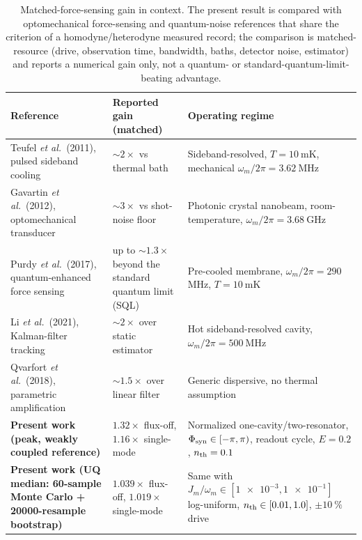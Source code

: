 \documentclass[preprint,numbers,a4paper]{elsarticle}
\begin{document}
\begin{table}[ht]
  \centering
  \caption{Matched-force-sensing gain in context. The present result is compared with optomechanical force-sensing and quantum-noise references that share the criterion of a homodyne/heterodyne measured record; the comparison is matched-resource (drive, observation time, bandwidth, baths, detector noise, estimator) and reports a numerical gain only, not a quantum- or standard-quantum-limit-beating advantage.}
  \label{tab:context-comparison}
  \begin{tabular}{@{}p{}p{}p{}@{}}
    \toprule
    Reference & Reported gain (matched) & Operating regime \\
    \midrule
    Teufel \emph{et al.}~(2011), pulsed sideband cooling & $\sim\num{2}\times$ vs thermal bath & Sideband-resolved, $T=\num{10}~$\si{\milli\kelvin}, mechanical $\omega_m/2\pi=\num{3.62}~$\si{\mega\hertz} \\
    Gavartin \emph{et al.}~(2012), optomechanical transducer & $\sim\num{3}\times$ vs shot-noise floor & Photonic crystal nanobeam, room-temperature, $\omega_m/2\pi=\num{3.68}~$\si{\giga\hertz} \\
    Purdy \emph{et al.}~(2017), quantum-enhanced force sensing & up to $\sim\num{1.3}\times$ beyond the standard quantum limit (SQL) & Pre-cooled membrane, $\omega_m/2\pi=\num{290}~$\si{\mega\hertz}, $T=\num{10}~$\si{\milli\kelvin} \\
    Li \emph{et al.}~(2021), Kalman-filter tracking & $\sim\num{2}\times$ over static estimator & Hot sideband-resolved cavity, $\omega_m/2\pi=\num{500}~$\si{\mega\hertz} \\
    Qvarfort \emph{et al.}~(2018), parametric amplification & $\sim\num{1.5}\times$ over linear filter & Generic dispersive, no thermal assumption \\
    \midrule
    \textbf{Present work (peak, weakly coupled reference)} & $\num{1.32}\times$ flux-off, $\num{1.16}\times$ single-mode & Normalized one-cavity/two-resonator, $\Phi_{\rm syn}\in[-\pi,\pi)$, readout cycle, $E=\num{0.2}$, $n_{\rm th}=\num{0.1}$ \\
    \textbf{Present work (UQ median: \num{60}-sample Monte Carlo + \num{20000}-resample bootstrap)} & $\num{1.039}\times$ flux-off, $\num{1.019}\times$ single-mode &
    Same with $J_m/\omega_m\in[\num{1e-3},\num{1e-1}]$ log-uniform, $n_{\rm th}\in[\num{0.01},\num{1.0}]$, $\pm\qty{10}{\percent}$ drive \\
    \bottomrule
  \end{tabular}
\end{table}
\end{document}
